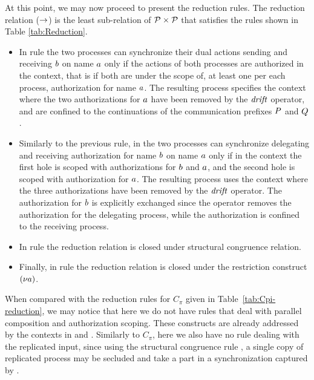 At this point, we may now proceed to present the reduction rules. The reduction relation ($\rightarrow$) is the least sub-relation of ${\cal P}\times{\cal P}$ that satisfies the rules shown in Table \ref{tab:Reduction}.
\begin{itemize}
\item 
In rule  the two processes can synchronize their dual actions sending and receiving $b$  on name $a$ only if the actions of both processes are authorized in the context, that is if both are under the scope of, at least one per each process, authorization for name ${a}$. The resulting process specifies the context where the two authorizations for $a$ have been removed by the $\mathit {drift}$ operator, and are confined to the continuations of the communication prefixes $P$ and $Q$.
\item 
 Similarly to the previous rule, in  the two processes can synchronize delegating and receiving authorization for name $b$  on name $a$ only if in the context the first hole is scoped with authorizations for $b$ and $a$, and the second hole is scoped with authorization for $a$. %
The resulting process uses the context where the three authorizations 
have been removed by the $\mathit {drift}$ operator. %
The authorization for $b$ is explicitly exchanged since the operator removes the authorization for the delegating process, while the authorization is confined to the receiving process.
\item 
In rule  the reduction relation is closed under structural congruence relation. 
\item 
Finally, in rule   the reduction relation is closed under the restriction construct $(\nu a)$. 
\end{itemize}
When compared with the reduction rules for $C_\pi$ given in Table~\ref{tab:Cpi-reduction}, we may notice that here we do not have rules that deal with parallel composition and authorization scoping.  These constructs are already addressed by the %
contexts in  and . Similarly to $C_\pi$, here we also have no rule dealing with the replicated input, since using the structural congruence rule , a single copy of replicated process may be secluded and take a part in a synchronization captured by .





